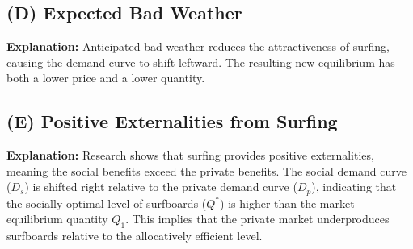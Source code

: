 \documentclass[12pt]{article}
\begin{document}
\subsection*{(D) Expected Bad Weather}
\begin{center}
\end{center}
\textbf{Explanation:} Anticipated bad weather reduces the attractiveness of surfing, causing the demand curve to shift leftward. The resulting new equilibrium has both a lower price and a lower quantity.

\subsection*{(E) Positive Externalities from Surfing}
\begin{center}
\end{center}
\textbf{Explanation:} Research shows that surfing provides positive externalities, meaning the social benefits exceed the private benefits. The social demand curve (\(D_s\)) is shifted right relative to the private demand curve (\(D_p\)), indicating that the socially optimal level of surfboards (\(Q^*\)) is higher than the market equilibrium quantity \(Q_1\). This implies that the private market underproduces surfboards relative to the allocatively efficient level.
\end{document}
